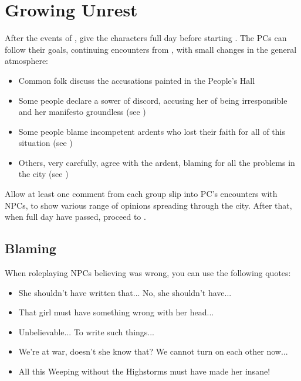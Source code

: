 \section{Growing Unrest}

After the events of , give the characters full day before starting . The PCs can follow their goals, continuing encounters from , with small changes in the general atmosphere:

\begin{itemize}
	\item Common folk discuss the accusations \npcRebelArdent{} painted in the People's Hall
	
	\item Some people declare \npcRebelArdent{} a sower of discord, accusing her of being irresponsible and her manifesto groundless (see )
	
	\item Some people blame incompetent ardents who lost their faith for all of this situation (see ) 
	
	\item Others, very carefully, agree with the ardent, blaming \npcQueen{} for all the problems in the city (see )
\end{itemize}

Allow at least one comment from each group slip into PC's encounters with NPCs, to show various range of opinions spreading through the city. After that, when full day have passed, proceed to .



\subsection{Blaming \npcRebelArdentName{}}
\label{ssec:unrestLoyal}

When roleplaying NPCs believing \npcRebelArdent{} was wrong, you can use the following quotes:

\begin{itemize}
	\item She shouldn't have written that... No, she shouldn't have...
	\item That girl must have something wrong with her head...
	\item Unbelievable... To write such things...
	\item We're at war, doesn't she know that? We cannot turn on each other now...
	\item All this Weeping without the Highstorms must have made her insane!
\end{itemize}

